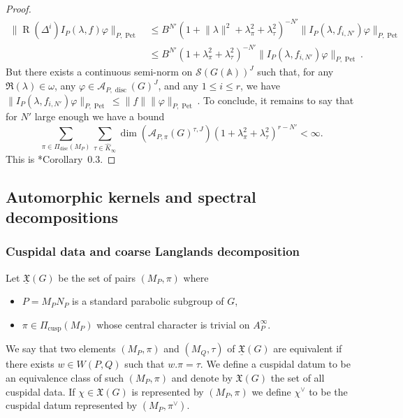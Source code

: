 \documentclass[letterpaper,11pt]{amsart}
\newcommand{\fX}{\mathfrak{X}}
\newcommand{\bA}{\mathbb{A}}
\newcommand{\cA}{\mathcal{A}}
\newcommand{\cS}{\mathcal{S}}
\newcommand{\<}{\negthickspace}
\providecommand{\aabs}[1]{\lVert#1\rVert}
\DeclareMathOperator{\rR}{R}
\DeclareMathOperator{\disc}{disc}
\DeclareMathOperator{\Pet}{Pet}
\DeclareMathOperator{\cusp}{cusp}
\theoremstyle{definition}
\theoremstyle{plain}
\theoremstyle{remark}
\numberwithin{equation}{section}
\begin{document}
\begin{proof}
        \begin{align*}
            \aabs{\rR(\Delta^i)I_P(\lambda,f)\varphi}_{P,\Pet} &\leq B^{N'} (1+\aabs{\lambda}^2+\lambda_\pi^2+\lambda_\tau^2)^{-N'} \aabs{I_P(\lambda,f_{i,N'})\varphi}_{P,\Pet} \\
            &\leq B^{N'} (1+\lambda_\pi^2+\lambda_\tau^2)^{-N'} \aabs{I_P(\lambda,f_{i,N'})\varphi}_{P,\Pet}.
        \end{align*}
        But there exists a continuous semi-norm on $\cS(G(\bA))^J$ such that, for any $\Re(\lambda) \in \omega$, any $\varphi \in \cA_{P,\disc}(G)^J$, and any $1 \leq i \leq r$, we have $\aabs{I_P(\lambda,f_{i,N'})\varphi}_{P,\Pet} \leq \aabs{f} \aabs{\varphi}_{P,\Pet}$. To conclude, it remains to say that for $N'$ large enough we have a bound
        \begin{equation*}
            \sum_{\pi \in \Pi_{\disc}(M_P)} \sum_{\tau \in \widehat{K}_\infty} \dim(\cA_{P,\pi}(G)^{\tau,J}) (1+\lambda_\pi^2+\lambda_\tau^2)^{r-N'} < \infty.
        \end{equation*}
        This is \cite{Mu}*{Corollary~0.3}.
    \end{proof}


\subsection[Spectral decompositions]{Automorphic kernels and spectral decompositions}


\subsubsection{Cuspidal data and coarse Langlands decomposition}
\label{subsec:cuspi_data}

Let $\underline{\fX}(G)$ be the set of pairs $(M_P, \pi)$ where 
\begin{itemize}
    \item $P = M_P N_P$ is a standard parabolic subgroup of $G$,
    \item $\pi \in \Pi_{\cusp}(M_P)$ whose central character is trivial on $A_P^\infty$.
\end{itemize}
We say that two elements $(M_P, \pi)$ and $(M_Q, \tau)$ of $\underline{\fX}(G)$ are equivalent if there exists $w \in W(P, Q)$ such that $w.\pi = \tau$. We define a cuspidal datum to be an equivalence class of such $(M_P, \pi)$ and denote by $\fX(G)$ the set of all cuspidal data. If $\chi \in \fX(G)$ is represented by $(M_P, \pi)$ we define $\chi^\vee$ to be the cuspidal datum represented by $(M_P, \pi^\vee)$. 
\end{document}
